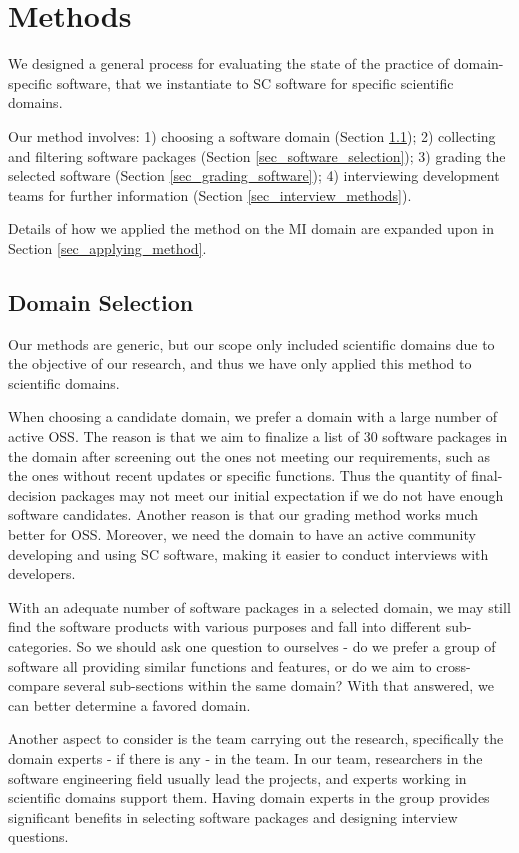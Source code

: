 \chapter{Methods}
\label{ch_methods}

We designed a general process for evaluating the state of the practice of domain-specific software, that we instantiate to SC software for specific scientific domains.

Our method involves: 1) choosing a software domain (Section \ref{sec_domain_selection}); 2) collecting and filtering software packages (Section \ref{sec_software_selection}); 3) grading the selected software (Section \ref{sec_grading_software}); 4) interviewing development teams for further information (Section \ref{sec_interview_methods}).

Details of how we applied the method on the MI domain are expanded upon in Section \ref{sec_applying_method}.

\section{Domain Selection}
\label{sec_domain_selection}
Our methods are generic, but our scope only included scientific domains due to the objective of our research, and thus we have only applied this method to scientific domains.

When choosing a candidate domain, we prefer a domain with a large number of active OSS. The reason is that we aim to finalize a list of 30 software packages \cite{SmithEtAl2021} in the domain after screening out the ones not meeting our requirements, such as the ones without recent updates or specific functions. Thus the quantity of final-decision packages may not meet our initial expectation if we do not have enough software candidates. Another reason is that our grading method works much better for OSS. Moreover, we need the domain to have an active community developing and using SC software, making it easier to conduct interviews with developers.

With an adequate number of software packages in a selected domain, we may still find the software products with various purposes and fall into different sub-categories. So we should ask one question to ourselves - do we prefer a group of software all providing similar functions and features, or do we aim to cross-compare several sub-sections within the same domain? With that answered, we can better determine a favored domain.

Another aspect to consider is the team carrying out the research, specifically the domain experts - if there is any - in the team. In our team, researchers in the software engineering field usually lead the projects, and experts working in scientific domains support them. Having domain experts in the group provides significant benefits in selecting software packages and designing interview questions.

